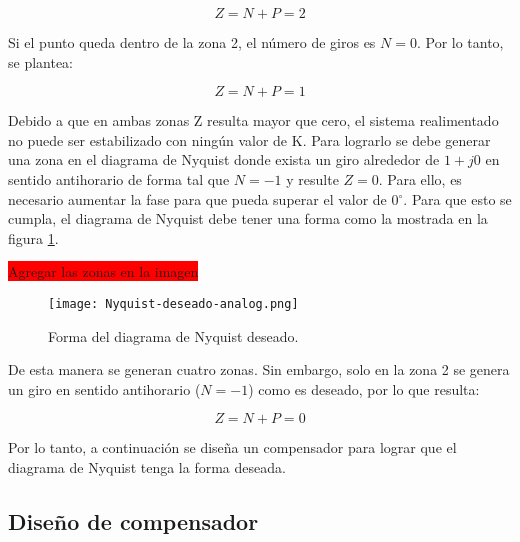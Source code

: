 \begin{equation*}
	Z = N + P = 2
\end{equation*}


Si el punto queda dentro de la zona 2, el número de giros es $N=0$. Por lo tanto, se plantea:

\begin{equation*}
	Z = N + P = 1
\end{equation*}

Debido a que en ambas zonas Z resulta mayor que cero, el sistema realimentado no puede ser estabilizado con ningún valor de K. Para lograrlo se debe generar una zona en el diagrama de Nyquist donde exista un giro alrededor de $1 + j0$ en sentido antihorario de forma tal que $N=-1$ y resulte $Z=0$. Para ello, es necesario aumentar la fase para que pueda superar el valor de 0$\mathrm{{}^\circ}$. Para que esto se cumpla, el diagrama de Nyquist debe tener una forma como la  mostrada en la figura \ref{fig:nyquist-deseado-analog}.

\colorbox{red}{Agregar las zonas en la imagen}

\begin{figure}[H]
	\centering
	\texttt{[image: Nyquist-deseado-analog.png]}
	\caption{Forma del diagrama de Nyquist deseado.}
	\label{fig:nyquist-deseado-analog}
\end{figure}

De esta manera se generan cuatro zonas. Sin embargo, solo en la zona 2 se genera un giro en sentido antihorario ($N=-1$) como es deseado, por lo que resulta:

\begin{equation*}
	Z = N + P = 0
\end{equation*}


Por lo tanto, a continuación se diseña un compensador para lograr que el diagrama de Nyquist tenga la forma deseada.


\subsection{Diseño de compensador}

